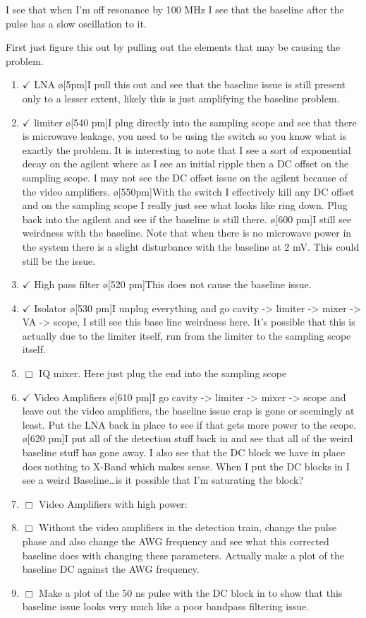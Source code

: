 \documentclass[10pt]{book}
\begin{document}
I see that when I'm off resonance by 100 MHz I see that the baseline after the pulse has a slow oscillation to it.

First just figure this out by pulling out the elements that may be causing the problem.

\begin{enumerate}
	\item $\checkmark$ LNA \o[5pm]{I pull this out and see that the baseline issue is still present only to a lesser extent, likely this is just amplifying the baseline problem.}
	\item $\checkmark$ limiter \o[540 pm]{I plug directly into the sampling scope and see that there is microwave leakage, you need to be using the switch so you know what is exactly the problem. It is interesting to note that I see a sort of exponential decay on the agilent where as I see an initial ripple then a DC offset on the sampling scope. I may not see the DC offset issue on the agilent because of the video amplifiers.} \o[550pm]{With the switch I effectively kill any DC offset and on the sampling scope I really just see what looks like ring down. Plug back into the agilent and see if the baseline is still there.} \o[600 pm]{I still see weirdness with the baseline. Note that when there is no microwave power in the system there is a slight disturbance with the baseline at 2 mV.} This could still be the issue.
	\item $\checkmark$ High pass filter \o[520 pm]{This does not cause the baseline issue.}
	\item $\checkmark$ Isolator \o[530 pm]{I unplug everything and go cavity -> limiter -> mixer -> VA -> scope, I still see this base line weirdness here. It's possible that this is actually due to the limiter itself, run from the limiter to the sampling scope itself.} 	\item $\Box$ IQ mixer. Here just plug the end into the sampling scope
	\item $\checkmark$ Video Amplifiers \o[610 pm]{I go cavity -> limiter -> mixer -> scope and leave out the video amplifiers, the baseline issue crap is gone or seemingly at least. Put the LNA back in place to see if that gets more power to the scope.} \o[620 pm]{I put all of the detection stuff back in and see that all of the weird baseline stuff has gone away. I also see that the DC block we have in place does nothing to X-Band which makes sense. When I put the DC blocks in I see a weird Baseline\ldots is it possible that I'm saturating the block?}
	\item $\Box$ Video Amplifiers with high power:
	\item $\Box$ Without the video amplifiers in the detection train, change the pulse phase and also change the AWG frequency and see what this corrected baseline does with changing these parameters. Actually make a plot of the baseline DC against the AWG frequency.
	\item $\Box$ Make a plot of the 50 ns pulse with the DC block in to show that this baseline issue looks very much like a poor bandpass filtering issue.
\end{enumerate}
\end{document}
